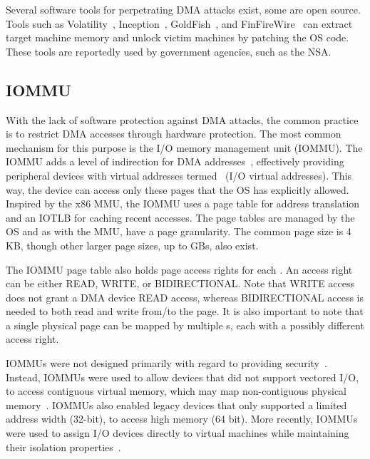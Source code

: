 Several software tools for perpetrating DMA attacks exist, some are open source. Tools such as Volatility~\cite{Vol}, Inception~\cite{MM}, GoldFish~\cite{GA10}, and FinFireWire~\cite{Fin14} can extract target machine memory and unlock victim machines by patching the OS code. These tools are reportedly used by government agencies, such as the NSA.

\subsection{IOMMU}

With the lack of software protection against DMA attacks, the common practice is to restrict DMA accesses through hardware protection. The most common mechanism for this purpose is the I/O memory management unit (IOMMU). The IOMMU adds a level of indirection for DMA addresses~\cite{WRC08,YZ15,SB12,MTF12}, effectively providing peripheral devices with virtual addresses termed~\iova{} (I/O virtual addresses). This way, the device can access only these pages that the OS has explicitly allowed. Inspired by the x86 MMU, the IOMMU uses a page table for address translation and an IOTLB for caching recent accesses.  The page tables are managed by the OS and as with the MMU, have a page granularity. The common page size is 4\,KB, though other larger page sizes, up to GBs, also exist.

The IOMMU page table also holds page access rights for each \iova. An access right can be either READ, WRITE, or BIDIRECTIONAL. Note that WRITE access does not grant a DMA device READ access, whereas BIDIRECTIONAL access is needed to both read and write from/to the page. It is also important to note that a single physical page can be mapped by multiple \iova{}s, each with a possibly different access right.

IOMMUs were not designed primarily with regard to providing security~\cite{DWT79}. Instead, IOMMUs were used to allow devices that did not support vectored I/O, to access contiguous virtual memory, which may map non-contiguous physical memory~\cite{Chu96, WMM97}. IOMMUs also enabled legacy devices that only supported a limited address width (32-bit), to access high memory (64 bit). More recently, IOMMUs were used to assign I/O devices directly to virtual machines while maintaining their isolation properties~\cite{Int16b, AMD16}. 
